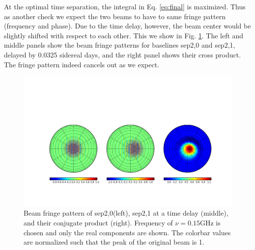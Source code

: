 \documentclass[twocolumn,apj,numberedappendix]{emulateapj}
\renewcommand\[{\begin{equation}}
\renewcommand\]{\end{equation}}
\begin{document}
At the optimal time separation, the integral in Eq. \eqref{eq:final}
is maximized. Thus as another check we expect the two beams to have to same fringe pattern
(frequency and phase). Due to the time delay, however, the beam center
would be slightly shifted with respect to each other. This we show
in Fig. \ref{fig:Beam-fringe-pattern}. The left and middle panels show the beam fringe
patterns for baselines sep2,0 and sep2,1, delayed by 0.0325 sidereal days,
and the right panel shows their cross product. The fringe pattern
indeed cancels out as we expect. 


\begin{figure}[h!]
\includegraphics[width=\linewidth]{fringe_res}
\caption{Beam fringe pattern of sep2,0(left), sep2,1 at a time delay (middle),
and their conjugate product (right). Frequency of $\nu=0.15\text{GHz}$ is
chosen and only the real components are shown. The colorbar values are normalized such that the peak of the original beam is 1. \label{fig:Beam-fringe-pattern}}
\end{figure}
\end{document}
